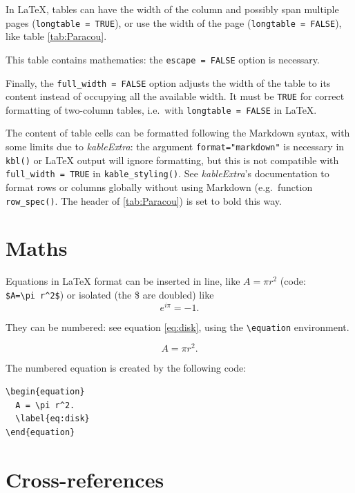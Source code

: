 \documentclass[
  12pt,
  american,
  a4paper,
  extrafontsizes,onecolumn,openright
  ]{memoir}
\begin{document}
\normalsize

In LaTeX, tables can have the width of the column and possibly span multiple pages (\texttt{longtable\ =\ TRUE}), or use the width of the page (\texttt{longtable\ =\ FALSE}), like table \ref{tab:Paracou}.

This table contains mathematics: the \texttt{escape\ =\ FALSE} option is necessary.

Finally, the \texttt{full\_width\ =\ FALSE} option adjusts the width of the table to its content instead of occupying all the available width.
It must be \texttt{TRUE} for correct formatting of two-column tables, i.e.~with \texttt{longtable\ =\ FALSE} in LaTeX.

The content of table cells can be formatted following the Markdown syntax, with some limits due to \emph{kableExtra}: the argument \texttt{format="markdown"} is necessary in \texttt{kbl()} or LaTeX output will ignore formatting, but this is not compatible with \texttt{full\_width\ =\ TRUE} in \texttt{kable\_styling()}.
See \emph{kableExtra}'s documentation to format rows or columns globally without using Markdown (e.g.~function \texttt{row\_spec()}.
The header of \ref{tab:Paracou}) is set to bold this way.

\section{Maths}\label{maths}

Equations in LaTeX format can be inserted in line, like \(A=\pi r^2\) (code: \texttt{\$A=\textbackslash{}pi\ r\^{}2\$}) or isolated (the \$ are doubled) like \[e^{i \pi} = -1.\]

They can be numbered: see equation \eqref{eq:disk}, using the \texttt{\textbackslash{}equation} environment.

\begin{equation}
  A = \pi r^2.
  \label{eq:disk}
\end{equation}

The numbered equation is created by the following code:

\begin{verbatim}
\begin{equation}
  A = \pi r^2.
  \label{eq:disk}
\end{equation}
\end{verbatim}

\section{Cross-references}\label{cross-references}
\end{document}

